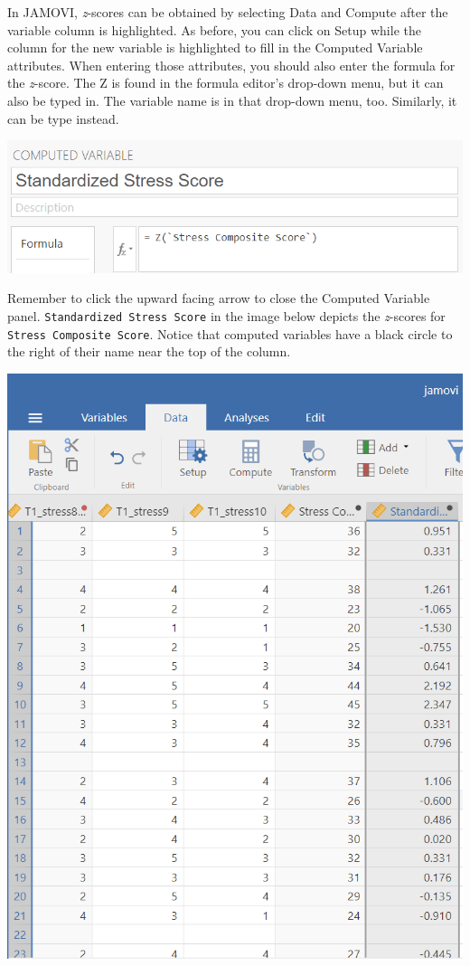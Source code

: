 \documentclass[
]{book}
\begin{document}
In JAMOVI, \emph{z}-scores can be obtained by selecting {Data} and {Compute} after the variable column is highlighted. As before, you can click on {Setup} while the column for the new variable is highlighted to fill in the Computed Variable attributes. When entering those attributes, you should also enter the formula for the \emph{z}-score. The Z is found in the formula editor's drop-down menu, but it can also be typed in. The variable name is in that drop-down menu, too. Similarly, it can be type instead.

\includegraphics{img/StressScale_ZScoreFormula.png}

Remember to click the upward facing arrow to close the Computed Variable panel. \texttt{Standardized\ Stress\ Score} in the image below depicts the \emph{z}-scores for \texttt{Stress\ Composite\ Score}. Notice that computed variables have a black circle to the right of their name near the top of the column.

\includegraphics{img/StressScale_ZScoreColumn.png}
\end{document}
